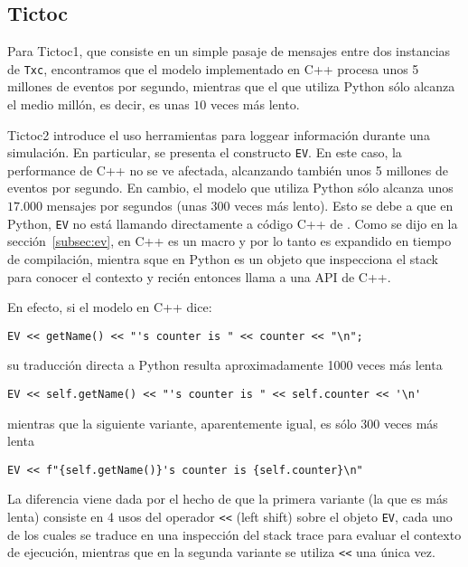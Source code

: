 \subsection{Tictoc}

Para Tictoc1, que consiste en un simple pasaje de mensajes entre dos instancias
de \verb!Txc!, encontramos que el modelo implementado en C++ procesa unos 5
millones de eventos por segundo, mientras que el que utiliza Python sólo
alcanza el medio millón, es decir, es unas $10$ veces más lento.

Tictoc2 introduce el uso herramientas para loggear información durante una
simulación. En particular, se presenta el constructo \verb!EV!.  En este caso,
la performance de C++ no se ve afectada, alcanzando también unos 5 millones de
eventos por segundo. En cambio, el modelo que utiliza Python sólo alcanza unos
$17.000$ mensajes por segundos (unas $300$ veces más lento). Esto se debe a que
en Python, \verb!EV! no está llamando directamente a código C++ de \omnetpp{}.
Como se dijo en la sección~\ref{subsec:ev}, en C++ es un macro y por lo tanto
es expandido en tiempo de compilación, mientra sque en Python es un objeto que
inspecciona el stack para conocer el contexto y recién entonces llama a una API
de C++.

En efecto, si el modelo en C++ dice:

\begin{verbatim}
EV << getName() << "'s counter is " << counter << "\n";
\end{verbatim}

\noindent su traducción directa a Python resulta aproximadamente 1000 veces más
lenta

\begin{verbatim}
EV << self.getName() << "'s counter is " << self.counter << '\n'
\end{verbatim}

\noindent mientras que la siguiente variante, aparentemente igual, es sólo 300
veces más lenta

\begin{verbatim}
EV << f"{self.getName()}'s counter is {self.counter}\n"
\end{verbatim}

La diferencia viene dada por el hecho de que la primera variante (la que es más
lenta) consiste en 4 usos del operador \verb!<<! (left shift) sobre el objeto
\verb!EV!, cada uno de los cuales se traduce en una inspección del stack trace
para evaluar el contexto de ejecución, mientras que en la segunda variante se
utiliza \verb!<<! una única vez.

